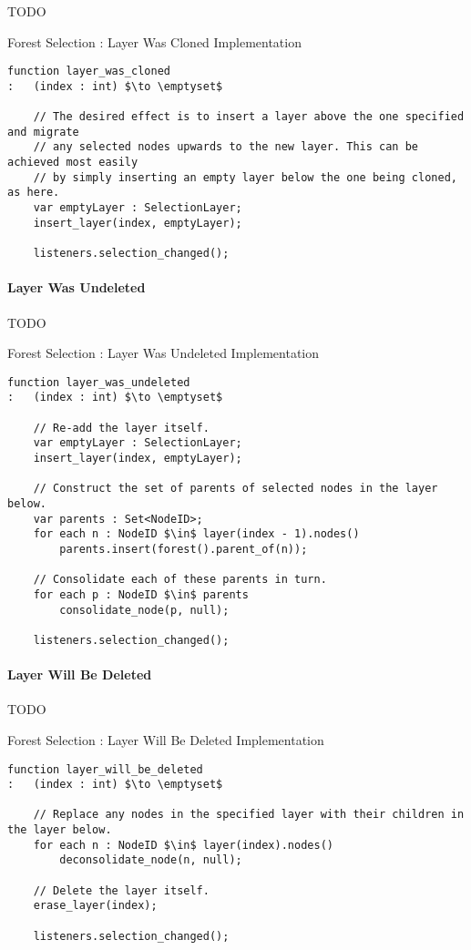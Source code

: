 TODO

\begin{stulisting}[p]
\caption{Forest Selection : Layer Was Cloned Implementation}
\label{code:ipfs-selection-layerwascloned}
\begin{lstlisting}[style=Default]
function layer_was_cloned
:	(index : int) $\to \emptyset$

	// The desired effect is to insert a layer above the one specified and migrate
	// any selected nodes upwards to the new layer. This can be achieved most easily
	// by simply inserting an empty layer below the one being cloned, as here.
	var emptyLayer : SelectionLayer;
	insert_layer(index, emptyLayer);

	listeners.selection_changed();
\end{lstlisting}
\end{stulisting}

\paragraph{Layer Was Undeleted}

TODO

\begin{stulisting}[p]
\caption{Forest Selection : Layer Was Undeleted Implementation}
\label{code:ipfs-selection-layerwasundeleted}
\begin{lstlisting}[style=Default]
function layer_was_undeleted
:	(index : int) $\to \emptyset$

	// Re-add the layer itself.
	var emptyLayer : SelectionLayer;
	insert_layer(index, emptyLayer);

	// Construct the set of parents of selected nodes in the layer below.
	var parents : Set<NodeID>;
	for each n : NodeID $\in$ layer(index - 1).nodes()
		parents.insert(forest().parent_of(n));

	// Consolidate each of these parents in turn.
	for each p : NodeID $\in$ parents
		consolidate_node(p, null);

	listeners.selection_changed();
\end{lstlisting}
\end{stulisting}

\paragraph{Layer Will Be Deleted}

TODO

\begin{stulisting}[p]
\caption{Forest Selection : Layer Will Be Deleted Implementation}
\label{code:ipfs-selection-layerwillbedeleted}
\begin{lstlisting}[style=Default]
function layer_will_be_deleted
:	(index : int) $\to \emptyset$

	// Replace any nodes in the specified layer with their children in the layer below.
	for each n : NodeID $\in$ layer(index).nodes()
		deconsolidate_node(n, null);

	// Delete the layer itself.
	erase_layer(index);

	listeners.selection_changed();
\end{lstlisting}
\end{stulisting}

